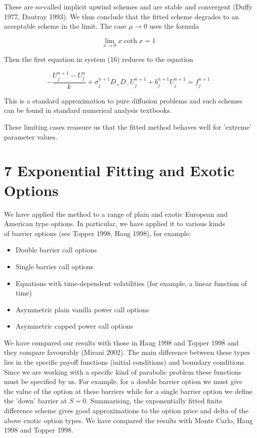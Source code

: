 \documentclass[10pt]{article}
\begin{document}
These are so-called implicit upwind schemes and are stable and convergent (Duffy 1977, Dautray 1993). We thus conclude that the fitted scheme degrades to an acceptable scheme in the limit. The case $\mu \rightarrow 0$ uses the formula

$$
\lim _{x \rightarrow 0} x \operatorname{coth} x=1
$$

Then the first equation in system (16) reduces to the equation

$$
-\frac{U_{j}^{n+1}-U_{j}^{n}}{k}+\sigma_{j}^{n+1} D_{+} D_{-} U_{j}^{n+1}+b_{j}^{n+1} U_{j}^{n+1}=f_{j}^{n+1}
$$

This is a standard approximation to pure diffusion problems and such schemes can be found in standard numerical analysis textbooks.

These limiting cases reassure us that the fitted method behaves well for 'extreme' parameter values.

\section*{7 Exponential Fitting and Exotic Options}
We have applied the method to a range of plain and exotic European and American type options. In particular, we have applied it to various kinds\\
of barrier options (see Topper 1998, Haug 1998), for example:

\begin{itemize}
  \item Double barrier call options
  \item Single barrier call options
  \item Equations with time-dependent volatilities (for example, a linear function of time)
  \item Asymmetric plain vanilla power call options
  \item Asymmetric capped power call options
\end{itemize}

We have compared our results with those in Haug 1998 and Topper 1998 and they compare favourably (Mirani 2002). The main difference between these types lies in the specific payoff functions (initial conditions) and boundary conditions. Since we are working with a specific kind of parabolic problem these functions must be specified by us. For example, for a double barrier option we must give the value of the option at these barriers while for a single barrier option we define the 'down' barrier at $S=0$. Summarising, the exponentially fitted finite difference scheme gives good approximations to the option price and delta of the above exotic option types. We have compared the results with Monte Carlo, Haug 1998 and Topper 1998.
\end{document}
